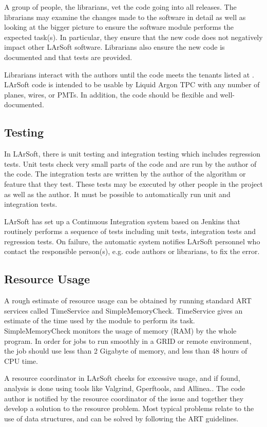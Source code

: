 \documentclass[12pt]{elsarticle}
\begin{document}
A group of people, the librarians, vet the code going into all releases. The librarians may examine the changes made to the software in detail as well as looking at the bigger picture to ensure the software module performs the expected task(s). In particular, they ensure that the new code does not negatively impact other LArSoft software. Librarians also ensure the new code is documented and that tests are provided.

Librarians interact with the authors until the code meets the tenants listed at \cite{code-tenants}. LArSoft code is intended to be usable by Liquid Argon TPC with any number of planes, wires, or PMTs. In addition, the code should be flexible and well-documented. 

\subsection{Testing}

In LArSoft, there is unit testing and integration testing which includes regression tests. Unit tests check very small parts of the code and are run by the author of the code. 
The integration tests are written by the author of the algorithm or feature that they test. These tests may be executed by other people in the project as well as the author. It must be possible to automatically run unit and  integration tests.

LArSoft has set up a Continuous Integration system based on Jenkins\cite{jenkins} that routinely performs a sequence of tests including unit tests, integration tests and regression tests. On failure, the automatic system notifies LArSoft personnel who contact the responsible person(s), e.g. code authors or librarians, to fix the error.

\subsection{Resource Usage}

A rough estimate of resource usage can be obtained by running standard ART services called TimeService and SimpleMemoryCheck. TimeService gives an estimate of the time used by the module to perform its task. SimpleMemoryCheck monitors the usage of memory (RAM) by the whole program. In order for jobs to run smoothly in a GRID or remote environment, the job should use less than 2 Gigabyte of memory, and less than 48 hours of CPU time.

A resource coordinator in LArSoft cheeks for excessive usage, and if found, analysis is done using tools like Valgrind\cite{valgrind}, Gperftools\cite{gperf}, and Allinea.\cite {allinea}.
The code author is notified by the resource coordinator of the issue and together they develop a solution to the resource problem. Most typical problems relate to the use of data structures, and can be solved by following the ART guidelines.\cite{art-guide}
 
\end{document}
